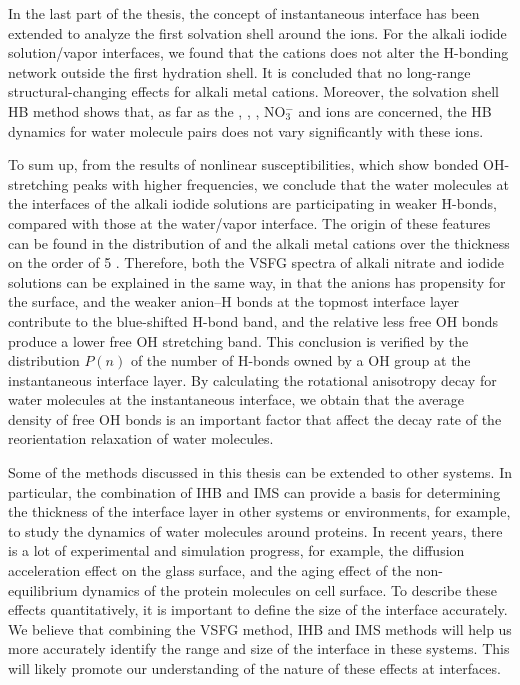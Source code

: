 In the last part of the thesis, the concept of instantaneous interface has been extended to analyze the first solvation shell around the ions.
For the alkali iodide solution/vapor interfaces, we found 
that the cations does not alter the H-bonding network outside the first hydration shell. 
It is concluded that no long-range structural-changing effects for alkali metal cations.
Moreover, the solvation shell HB method shows that, 
as far as the \Li, \Na, \K, NO$^-_3$ and \I ions are concerned, 
the HB dynamics for water molecule pairs does not vary significantly with these ions.


To sum up, from the results of nonlinear susceptibilities, which show bonded OH-stretching peaks with higher frequencies, 
we conclude that the water molecules at the interfaces of the alkali iodide solutions are participating 
in weaker H-bonds, compared with those at the water/vapor interface. 
The origin of these features can be found in the distribution of \I and the alkali metal cations
over the thickness on the order of 5 \A. 
Therefore, both the VSFG spectra of alkali nitrate and iodide solutions can be explained in the same way, 
in that the anions has propensity for the surface, and the weaker anion--H bonds at the topmost interface layer contribute to the blue-shifted H-bond band,
and the relative less free OH bonds produce a lower free OH stretching band.
This conclusion is verified by the distribution $P(n)$ of the number of H-bonds owned by a OH group at the instantaneous interface layer. 
By calculating the rotational anisotropy decay for water molecules at the instantaneous interface, 
we obtain that the average density of free OH bonds is an important factor that affect the decay rate of the reorientation relaxation of water molecules.


Some of the methods discussed in this thesis can be extended to other systems.
In particular, the combination of IHB and IMS can provide a basis for determining the thickness of the interface layer in other systems or environments, 
for example, to study the dynamics of water molecules around proteins. 
In recent years, there is a lot of experimental and simulation progress, for example, the diffusion acceleration effect on the glass surface\cite{ZhuL11,ZhangWei16}, 
and the aging effect of the non-equilibrium dynamics of the protein molecules on cell surface\cite{HuXiaohu16}. 
To describe these effects quantitatively, it is important to define the size of the interface accurately. 
We believe that combining the VSFG method, IHB and IMS methods will help us more accurately identify the range and size of the interface in these systems.
This will likely promote our understanding of the nature of these effects at interfaces.


